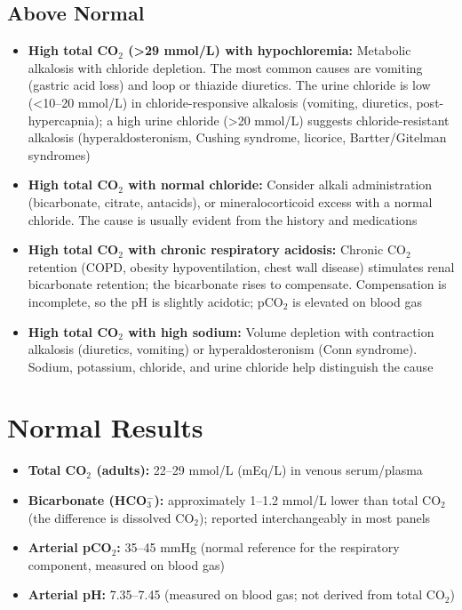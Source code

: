 \subsection*{Above Normal}
\begin{itemize}
  \item \textbf{High total CO$_2$ (>29 mmol/L) with hypochloremia:} Metabolic alkalosis with chloride depletion. The most common causes are vomiting (gastric acid loss) and loop or thiazide diuretics. The urine chloride is low (<10--20 mmol/L) in chloride-responsive alkalosis (vomiting, diuretics, post-hypercapnia); a high urine chloride (>20 mmol/L) suggests chloride-resistant alkalosis (hyperaldosteronism, Cushing syndrome, licorice, Bartter/Gitelman syndromes)
  \item \textbf{High total CO$_2$ with normal chloride:} Consider alkali administration (bicarbonate, citrate, antacids), or mineralocorticoid excess with a normal chloride. The cause is usually evident from the history and medications
  \item \textbf{High total CO$_2$ with chronic respiratory acidosis:} Chronic CO$_2$ retention (COPD, obesity hypoventilation, chest wall disease) stimulates renal bicarbonate retention; the bicarbonate rises to compensate. Compensation is incomplete, so the pH is slightly acidotic; pCO$_2$ is elevated on blood gas
  \item \textbf{High total CO$_2$ with high sodium:} Volume depletion with contraction alkalosis (diuretics, vomiting) or hyperaldosteronism (Conn syndrome). Sodium, potassium, chloride, and urine chloride help distinguish the cause
\end{itemize}

\section*{Normal Results}
\begin{itemize}
  \item \textbf{Total CO$_2$ (adults):} 22--29 mmol/L (mEq/L) in venous serum/plasma
  \item \textbf{Bicarbonate (HCO$_3^-$):} approximately 1--1.2 mmol/L lower than total CO$_2$ (the difference is dissolved CO$_2$); reported interchangeably in most panels
  \item \textbf{Arterial pCO$_2$:} 35--45 mmHg (normal reference for the respiratory component, measured on blood gas)
  \item \textbf{Arterial pH:} 7.35--7.45 (measured on blood gas; not derived from total CO$_2$)
\end{itemize}

